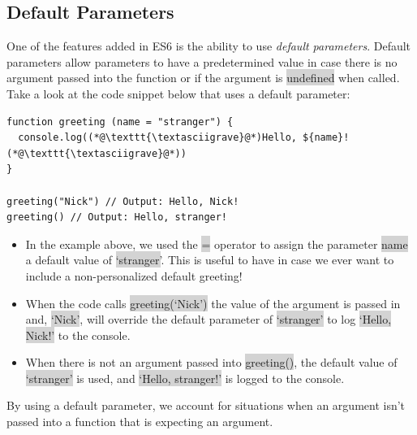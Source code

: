 \documentclass[11pt]{article}
\begin{document}
\subsection{Default Parameters}
One of the features added in ES6 is the ability to use \textit{default parameters}. Default parameters allow parameters to have a predetermined value in case there is no argument passed into the function or if the argument is \colorbox{lightgray}{undefined} when called. \\
\newline
Take a look at the code snippet below that uses a default parameter:
\begin{lstlisting}
function greeting (name = "stranger") {
  console.log((*@\texttt{\textasciigrave}@*)Hello, ${name}!(*@\texttt{\textasciigrave}@*))
}

greeting("Nick") // Output: Hello, Nick!
greeting() // Output: Hello, stranger!
\end{lstlisting}
\begin{itemize}[leftmargin = *]
\item In the example above, we used the \colorbox{lightgray}{=} operator to assign the parameter \colorbox{lightgray}{name} a default value of \colorbox{lightgray}{`stranger'}. This is useful to have in case we ever want to include a non-personalized default greeting!
\item When the code calls \colorbox{lightgray}{greeting(`Nick')} the value of the argument is passed in and, \colorbox{lightgray}{`Nick'}, will override the default parameter of \colorbox{lightgray}{`stranger'} to log \colorbox{lightgray}{`Hello, Nick!'} to the console.
\item When there is not an argument passed into \colorbox{lightgray}{greeting()}, the default value of \colorbox{lightgray}{`stranger'} is used, and \colorbox{lightgray}{`Hello, stranger!'} is logged to the console.
\end{itemize}
By using a default parameter, we account for situations when an argument isn’t passed into a function that is expecting an argument.
\end{document}
